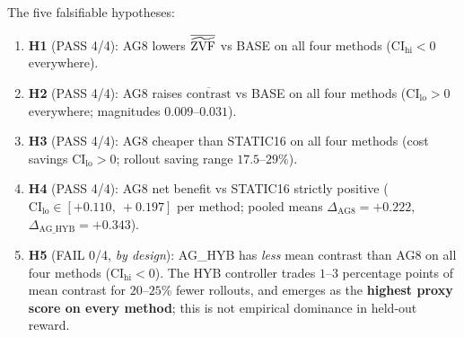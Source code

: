 \begin{table}[ht]
\centering\small
\caption{iter-199 paired bootstrap CI table ($B=2000$, seed=20260706, $n=40$ per-method paired steps). Every controller-vs-baseline contrast on AG8 vs BASE / STATIC16 has CI95 disjoint from zero. The HYB-vs-AG8 contrast row is the deliberate cost-saving FAIL (H5).}
\label{tab:iter199-cis}
\vspace{2pt}
\end{table}

The five falsifiable hypotheses:
\begin{enumerate}
\item \textbf{H1} (PASS 4/4): AG8 lowers $\overline{\widetilde{\mathrm{ZVF}}}$ vs BASE on all four
  methods ($\mathrm{CI_{hi}} < 0$ everywhere).
\item \textbf{H2} (PASS 4/4): AG8 raises $\overline{\mathrm{contrast}}$ vs
  BASE on all four methods ($\mathrm{CI_{lo}} > 0$ everywhere; magnitudes
  $0.009$--$0.031$).
\item \textbf{H3} (PASS 4/4): AG8 cheaper than STATIC16 on all four methods
  (cost savings $\mathrm{CI_{lo}} > 0$; rollout saving range $17.5$--$29\%$).
\item \textbf{H4} (PASS 4/4): AG8 net benefit vs STATIC16 strictly positive
  ($\mathrm{CI_{lo}} \in [+0.110,\ +0.197]$ per method; pooled means
  $\Delta_{\text{AG8}}=+0.222$, $\Delta_{\text{AG\_HYB}}=+0.343$).
\item \textbf{H5} (FAIL 0/4, \emph{by design}): AG\_HYB has \emph{less}
  mean contrast than AG8 on all four methods ($\mathrm{CI_{hi}}<0$).
  The HYB controller trades $1$--$3$ percentage points of mean contrast
  for $20$--$25\%$ fewer rollouts, and emerges as the
  \textbf{highest proxy score on every method}; this is not empirical
  dominance in held-out reward.
\end{enumerate}

